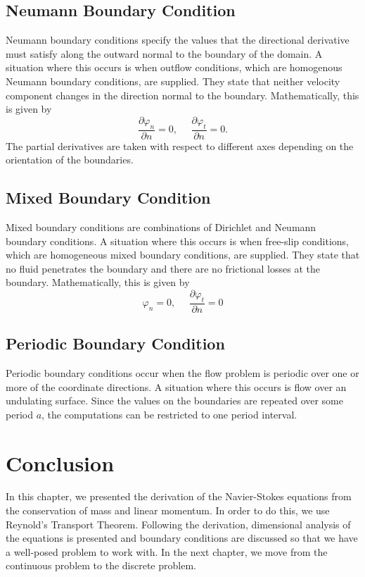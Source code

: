\subsection{Neumann Boundary Condition}

Neumann boundary conditions specify the values that the directional derivative must satisfy along the outward normal to the boundary of the domain. A situation where this occurs is when outflow conditions, which are homogenous Neumann boundary conditions, are supplied. They state that neither velocity component changes in the direction normal to the boundary. Mathematically, this is given by \begin{equation} \frac{\partial \varphi_{n}}{\partial n} = 0, \ \ \ \ \ \ \frac{\partial \varphi_{t}}{\partial n} = 0. \end{equation} The partial derivatives are taken with respect to different axes depending on the orientation of the boundaries.

\subsection{Mixed Boundary Condition}

Mixed boundary conditions are combinations of Dirichlet and Neumann boundary conditions. A situation where this occurs is when free-slip conditions, which are homogeneous mixed boundary conditions, are supplied. They state that no fluid penetrates the boundary and there are no frictional losses at the boundary. Mathematically, this is given by \begin{equation} \varphi_{n} = 0, \ \ \ \ \ \ \frac{\partial \varphi_{t}}{\partial n} = 0 \end{equation}

\subsection{Periodic Boundary Condition}

Periodic boundary conditions occur when the flow problem is periodic over one or more of the coordinate directions. A situation where this occurs is flow over an undulating surface. Since the values on the boundaries are repeated over some period $a$, the computations can be restricted to one period interval.

\section{Conclusion}

In this chapter, we presented the derivation of the Navier-Stokes equations from the conservation of mass and linear momentum. In order to do this, we use Reynold's Transport Theorem. Following the derivation, dimensional analysis of the equations is presented and boundary conditions are discussed so that we have a well-posed problem to work with. In the next chapter, we move from the continuous problem to the discrete problem.
%
%